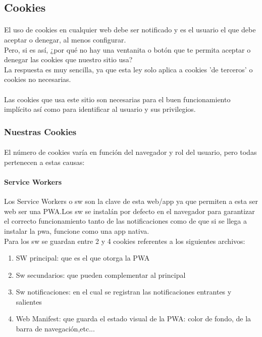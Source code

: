 \documentclass[a4paper]{article}
\begin{document}
 \subsection[Cookies]{Cookies}
 \paragraph{}
 El uso de cookies en cualquier web debe ser notificado y es el usuario el que debe 
 aceptar o denegar, al menos configurar.\\
 Pero, si es así, ¿por qué no hay una ventanita o botón que te permita aceptar o 
 denegar las cookies que nuestro sitio usa?\\
 La respuesta es muy sencilla, ya que esta ley solo aplica a cookies 'de terceros' o
 cookies no necesarias.\\
 \paragraph{}
 Las cookies que usa este sitio son necesarias para el buen funcionamiento implícito 
 así como para identificar al usuario y sus privilegios.
 \subsubsection[¿Qué cookies usamos?]{Nuestras Cookies}
 \paragraph{}
 El número de cookies varía en función del navegador y rol del usuario, pero 
 todas pertenecen a estas causas:
 \paragraph{Service Workers}
 Los Service Workers o sw son la clave de esta web/app ya que permiten a esta ser web 
 ser una PWA.Los sw se instalán por defecto en el navegador para garantizar el correcto 
 funcionamiento tanto de las notificaciones como de que si se llega a instalar la pwa,
  funcione como una app nativa.\\
  Para los sw se guardan entre 2 y 4 cookies referentes a los siguientes archivos:
  \begin{enumerate}
   \item SW principal: que es el que otorga la PWA
   \item Sw secundarios: que pueden complementar al principal
   \item Sw notificaciones: en el cual se registran las notificaciones entrantes y salientes
   \item Web Manifest: que guarda el estado visual de la PWA: color de fondo, de la barra de navegación,etc...
  \end{enumerate}
\end{document}
